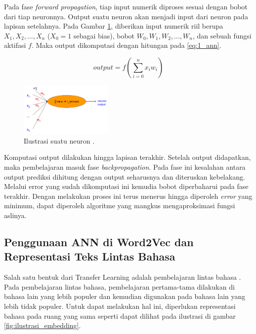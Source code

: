 \documentclass[conference]{IEEEtran}
\begin{document}
	Pada fase \textit{forward propagation}, tiap input numerik diproses sesuai dengan bobot dari tiap neuronnya. Output suatu neuron akan menjadi input dari neuron pada lapisan setelahnya. Pada Gambar \ref{fig:ilustrasi_neuron}, diberikan input numerik riil berupa \(X_1, X_2, \ldots, X_n\) (\(X_0 = 1\) sebagai bias), bobot \(W_0, W_1, W_2, \ldots, W_n\), dan sebuah fungsi aktifasi \(f\). Maka output dikomputasi dengan hitungan pada \ref{eq:1_ann}.

	\begin{equation}
		output = f(\sum_{i=0}^{n}x_iw_i)
		\label{eq:1_ann}
	\end{equation} 

	\begin{figure}[htbp]
	    \centerline{
	    \includegraphics[width=0.4\textwidth]{resources/ilustrasi_neuron.png}
	    }
	    \caption{Ilustrasi suatu neuron \cite{b6}.}
	    \label{fig:ilustrasi_neuron}
	\end{figure}

	Komputasi output dilakukan hingga lapisan terakhir. Setelah output didapatkan, maka pembelajaran masuk fase \textit{backpropagation}. Pada fase ini kesalahan antara output prediksi dihitung dengan output seharusnya dan diteruskan kebelakang. Melalui error yang sudah dikomputasi ini kemudia bobot diperbaharui pada fase terakhir. Dengan melakukan proses ini terus menerus hingga diperoleh \textit{error} yang minimum, dapat diperoleh algoritme yang mangkus mengaproksimasi fungsi aslinya.

	\subsection{Penggunaan ANN di Word2Vec dan Representasi Teks Lintas Bahasa}
	Salah satu bentuk dari Transfer Learning adalah pembelajaran lintas bahasa \cite{b7}. Pada pembelajaran lintas bahasa, pembelajaran pertama-tama dilakukan di bahasa lain yang lebih populer dan kemudian digunakan pada bahasa lain yang lebih tidak populer. Untuk dapat melakukan hal ini, diperlukan representasi bahasa pada ruang yang sama seperti dapat dilihat pada ilustrasi di gambar \ref{fig:ilustrasi_embedding}.
\end{document}
